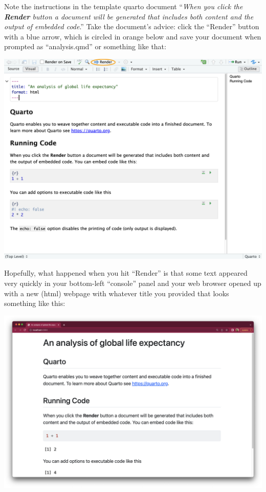 \documentclass[
  letterpaper,
  DIV=11,
  numbers=noendperiod]{scrreprt}
\begin{document}
Note the instructions in the template quarto document ``\emph{When you
click the \textbf{Render} button a document will be generated that
includes both content and the output of embedded code}.'' Take the
document's advice: click the ``Render'' button with a blue arrow, which
is circled in orange below and save your document when prompted as
``analysis.qmd'' or something like that:

\includegraphics[width=10.71in,height=\textheight]{figures/render.png}

Hopefully, what happened when you hit ``Render'' is that some text
appeared very quickly in your bottom-left ``console'' panel and your web
browser opened up with a new (html) webpage with whatever title you
provided that looks something like this:

\includegraphics[width=11.79in,height=\textheight]{figures/render_doc.png}
\end{document}
